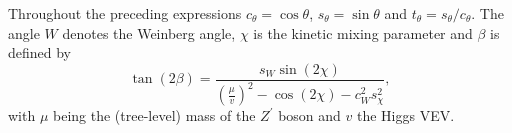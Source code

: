 \documentclass[11pt, a4paper]{article}
\begin{document}
%
Throughout the preceding expressions $c_\theta = \cos\theta$, $s_\theta =
\sin\theta$ and $t_\theta = s_\theta/c_\theta$. The angle $W$ denotes the
Weinberg angle, $\chi$ is the kinetic mixing parameter and $\beta$ is defined
by
%
\[   \tan(2\beta) = \frac{s_W \sin(2\chi)}{\left(\frac{\mu}{v}\right)^2 -
\cos(2\chi) - c_W^2 s_\chi^2}, \]
%
with $\mu$ being the (tree-level) mass of the $Z^\prime$ boson and $v$ the
Higgs VEV.



{}
\end{document}
